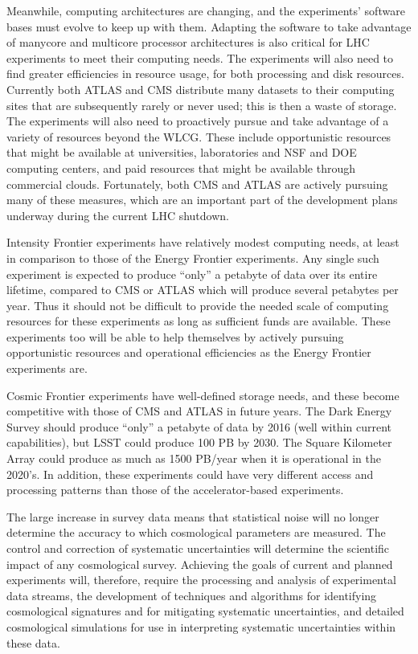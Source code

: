 Meanwhile, computing architectures are changing, and the experiments’ software bases must evolve to keep up with them.  Adapting the software to take advantage of manycore and multicore 
processor architectures is also critical for LHC experiments to meet their computing needs.  The experiments will also need to find greater efficiencies in resource usage, for both processing and disk resources.  Currently both ATLAS and CMS distribute many datasets to their computing sites that are subsequently rarely or never used; this is then a waste of storage.  The experiments will also need to proactively pursue and take advantage of a variety of resources beyond the WLCG.  These include opportunistic resources that might be available at universities, laboratories and NSF and DOE computing centers, and paid resources that might be available through commercial clouds.  Fortunately, both CMS and ATLAS are actively pursuing many of these measures, which are an important part of the development plans underway during the current LHC shutdown.

Intensity Frontier experiments have relatively modest computing needs, at least in comparison to those of the Energy Frontier experiments.  Any single such experiment is expected to produce “only” a petabyte of data over its entire lifetime, compared to CMS or ATLAS which will produce several petabytes per year.  Thus it should not be difficult to provide the needed scale of computing resources for these experiments as long as sufficient funds are available.  These experiments too will be able to help themselves by actively pursuing opportunistic resources and operational efficiencies as the Energy Frontier experiments are.

Cosmic Frontier experiments have well-defined storage needs, and these become competitive with those of CMS and ATLAS in future years.  The Dark Energy Survey should produce “only” a petabyte of data by 2016 (well within current capabilities), but LSST could produce 100 PB by 2030.  The Square Kilometer Array could produce as much as 1500 PB/year when it is operational in the 2020’s.  In addition, these experiments could have very different access and processing patterns than those of the accelerator-based experiments.  

The large increase in survey data means that statistical noise will no longer determine the accuracy to which cosmological parameters are 
measured. The control and correction of systematic uncertainties will determine the scientific impact of any cosmological survey. 
Achieving the goals of current and planned experiments will, therefore, require the processing and analysis of experimental data streams, 
the development of techniques and algorithms for identifying cosmological signatures and for mitigating systematic uncertainties, 
 and detailed cosmological simulations for use in interpreting systematic uncertainties within these data. 

